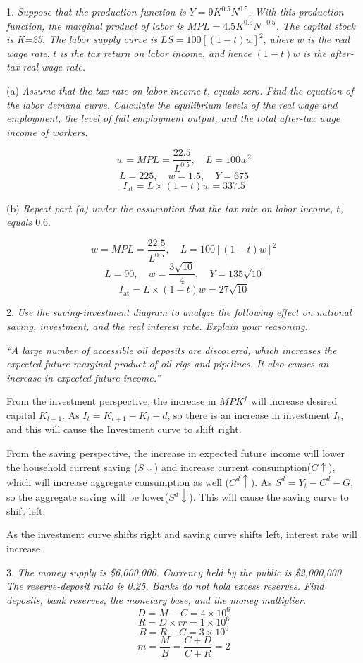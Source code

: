 \documentclass[10pt, a4paper]{article}
\begin{document}
1. \emph{Suppose that the production function is $Y = 9K^{0.5}N^{0.5}$. With this production function,
the marginal product of labor is $MPL=4.5K^{0.5}N^{-0.5}$. The capital stock is K=25. The labor supply
curve is} $LS=100[(1-t)w]^2$, \emph{where} $w$ \emph{is the real wage rate}, $t$ \emph{is the tax return on labor income, and
hence}  $(1-t)w$ \emph{is the after-tax real wage rate.}


(a) \emph{Assume that the tax rate on labor income} $t$, \emph{equals zero. Find the equation of the labor demand
curve. Calculate the equilibrium levels of the real wage and employment, the level of full employment
output, and the total after-tax wage income of workers.}

$$w = MPL = \frac{22.5}{L^{0.5}}, \quad L = 100w^2$$
$$L = 225,\quad w = 1.5, \quad Y = 675$$
$$I_{\text{at}} = L \times (1 - t)w = 337.5$$

(b) \emph{Repeat part (a) under the assumption that the tax rate on labor income, $t$, equals $0.6$}.

$$w = MPL = \frac{22.5}{L^{0.5}}, \quad L = 100[(1 - t)w]^2$$
$$L = 90, \quad w = \frac{3\sqrt{10}}{4}, \quad Y = 135\sqrt{10}$$
$$I_{\text{at}} = L \times (1 - t)w = 27\sqrt{10}$$


2.\emph{ Use the saving-investment diagram to analyze the following effect on national
saving, investment, and the real interest rate. Explain your reasoning.}

\emph{“A large number of accessible oil deposits are discovered, which increases the expected future
marginal product of oil rigs and pipelines. It also causes an increase in expected future income.”}
\smallskip

From the investment perspective, the increase in $MPK^f$ will increase desired capital $K_{t+1}$. As $I_t = K_{t+1} - K_{t} - d$, so there is an increase in investment $I_t$, and this will cause the Investment curve to shift right.

From the saving perspective, the increase in expected future income will lower the household current saving ($S\downarrow$) and increase current consumption($C\uparrow$), which will increase aggregate consumption as well ($C^d\uparrow$). As $S^d = Y_t - C^d - G$, so the aggregate saving will be lower($S^d\downarrow$). This will cause the saving curve to shift left.

As the investment curve shifts right and saving curve shifts left, interest rate will increase.
\newpage

3. \emph{The money supply is \$6,000,000. Currency held by the public is \$2,000,000. The
reserve-deposit ratio is 0.25. Banks do not hold excess reserves. Find deposits, bank reserves, the
monetary base, and the money multiplier.}
$$D = M - C = 4 \times 10^6$$
$$R = D \times rr = 1 \times 10^6$$
$$B = R + C = 3 \times 10^6$$
$$m = \frac{M}{B} = \frac{C + D}{C + R} = 2$$
\end{document}
